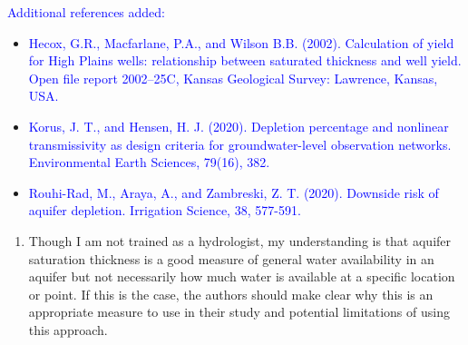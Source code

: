 \documentclass[
]{article}
\providecommand{\tightlist}{%
  \setlength{\itemsep}{0pt}\setlength{\parskip}{0pt}}
\begin{document}
\textcolor{blue}{Additional references added:}

\begin{itemize}
\item
  \textcolor{blue}{Hecox, G.R., Macfarlane, P.A., and Wilson B.B. (2002). Calculation of yield for High Plains wells: relationship between saturated thickness and well yield. Open file report 2002–25C, Kansas Geological Survey: Lawrence, Kansas, USA.}
\item
  \textcolor{blue}{Korus, J. T., and Hensen, H. J. (2020). Depletion percentage and nonlinear transmissivity as design criteria for groundwater-level observation networks. Environmental Earth Sciences, 79(16), 382.}
\item
  \textcolor{blue}{Rouhi-Rad, M., Araya, A., and Zambreski, Z. T. (2020). Downside risk of aquifer depletion. Irrigation Science, 38, 577-591.}
\end{itemize}

\begin{enumerate}
\def\labelenumi{\arabic{enumi}.}
\setcounter{enumi}{1}
\tightlist
\item
  Though I am not trained as a hydrologist, my understanding is that
  aquifer saturation thickness is a good measure of general water
  availability in an aquifer but not necessarily how much water is
  available at a specific location or point. If this is the case, the
  authors should make clear why this is an appropriate measure to use in
  their study and potential limitations of using this approach.
\end{enumerate}
\end{document}
